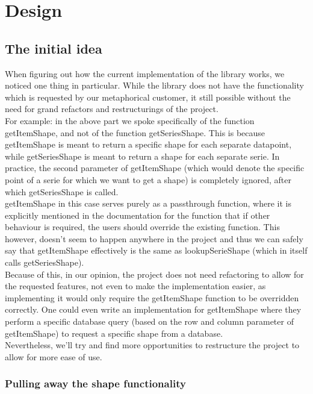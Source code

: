 \documentclass{article}
\begin{document}
\section{Design}

\subsection{The initial idea}

When figuring out how the current implementation of the library works, we noticed one thing in particular. While the library does not have the functionality which is requested by our metaphorical customer, it still possible without the need for grand refactors and restructurings of the project.\\

For example: in the above part we spoke specifically of the function getItemShape, and not of the function getSeriesShape. This is because getItemShape is meant to return a specific shape for each separate datapoint, while getSeriesShape is meant to return a shape for each separate serie. In practice, the second parameter of getItemShape (which would denote the specific point of a serie for which we want to get a shape) is completely ignored, after which getSeriesShape is called.\\

getItemShape in this case serves purely as a passthrough function, where it is explicitly mentioned in the documentation for the function that if other behaviour is required, the users should override the existing function. This however, doesn't seem to happen anywhere in the project and thus we can safely say that getItemShape effectively is the same as lookupSerieShape (which in itself calls getSeriesShape).\\

Because of this, in our opinion, the project does not need refactoring to allow for the requested features, not even to make the implementation easier, as implementing it would only require the getItemShape function to be overridden correctly. One could even write an implementation for getItemShape where they perform a specific database query (based on the row and column parameter of getItemShape) to request a specific shape from a database.\\

Nevertheless, we'll try and find more opportunities to restructure the project to allow for more ease of use.

\subsubsection{Pulling away the shape functionality}
\end{document}
